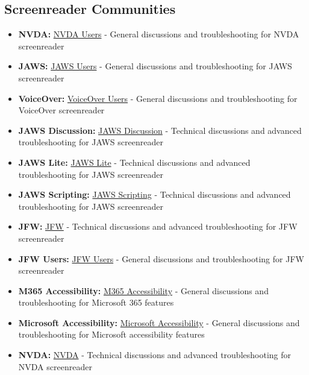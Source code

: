 \subsection{Screenreader Communities}\label{app2:screenreader-communities}
\begin{itemize}
	\item \textbf{NVDA:} \href{https://groups.google.com/a/nvaccess.org/g/NVDA-users}{NVDA Users} - General discussions and troubleshooting for NVDA screenreader
	\item \textbf{JAWS:} \href{https://groups.io/g/jaws-users}{JAWS Users} - General discussions and troubleshooting for JAWS screenreader
	\item \textbf{VoiceOver:} \href{https://groups.io/g/voiceover-users}{VoiceOver Users} - General discussions and troubleshooting for VoiceOver screenreader
	\item \textbf{JAWS Discussion:} \href{https://groups.io/g/jawsdiscussion/messages}{JAWS Discussion} - Technical discussions and advanced troubleshooting for JAWS screenreader
	\item \textbf{JAWS Lite:} \href{https://groups.io/g/jawslite/messages}{JAWS Lite} - Technical discussions and advanced troubleshooting for JAWS screenreader
	\item \textbf{JAWS Scripting:} \href{https://groups.io/g/jawsscripting/messages}{JAWS Scripting} - Technical discussions and advanced troubleshooting for JAWS screenreader
	\item \textbf{JFW:} \href{https://jfw.groups.io/g/main/messages}{JFW} - Technical discussions and advanced troubleshooting for JFW screenreader
	\item \textbf{JFW Users:} \href{https://groups.io/g/jfw-users/messages}{JFW Users} - General discussions and troubleshooting for JFW screenreader
	\item \textbf{M365 Accessibility:} \href{https://groups.io/g/M365-Accessibility/messages}{M365 Accessibility} - General discussions and troubleshooting for Microsoft 365  features
	\item \textbf{Microsoft Accessibility:} \href{https://groups.io/g/MicrosoftAccessibility/messages}{Microsoft Accessibility} - General discussions and troubleshooting for Microsoft accessibility features
	\item \textbf{NVDA:} \href{https://NVDA.groups.io/g/NVDA/messages}{NVDA} - Technical discussions and advanced troubleshooting for NVDA screenreader

\end{itemize}

